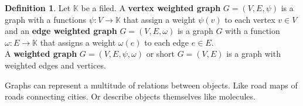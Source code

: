 \documentclass{article}
\theoremstyle{definition}
\newtheorem{definition}[theorem]{Definition}
\begin{document}
\begin{definition}
Let $\mathbb{K}$ be a filed. A \textbf{vertex weighted graph} $G = (V, E, \psi)$ is a graph with a functions $\psi : V \to \mathbb{K}$ that assign a weight $\psi(v)$ to each vertex $v \in V$ and an \textbf{edge weighted graph} $G = (V, E, \omega)$ is a graph $G$ with a function $\omega : E \to \mathbb{K}$ that assigns a weight $\omega(e)$ to each edge $e \in E$. \\
A \textbf{weighted graph} $G = (V, E, \psi, \omega)$ or short $G = (V, E)$ is a graph with weighted edges and vertices.
\end{definition}


Graphs can represent a multitude of relations between objects. Like road maps of roads connecting cities. Or describe objects themselves like molecules.
\end{document}
